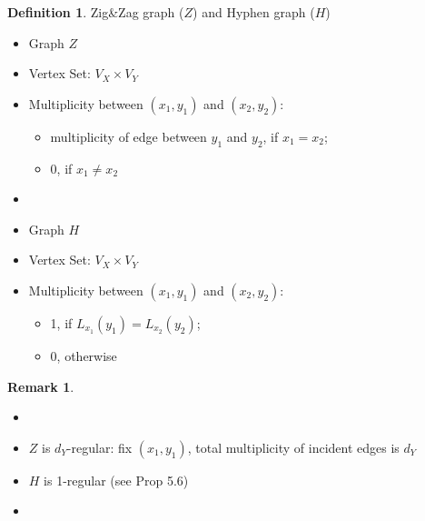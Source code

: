 \documentclass{book}
\theoremstyle{definition}
\newtheorem{definition}[lemma]{Definition}
\theoremstyle{remarkstyle}
\newtheorem*{remark}{Remark}%
\begin{document}
\begin{definition} Zig\&Zag graph ($Z$) and Hyphen graph ($H$) 
    \begin{itemize}
        \item Graph $Z$
        \item Vertex Set: $V_X\times V_Y$
        \item Multiplicity between $(x_1,y_1)$ and $(x_2,y_2)$:
        \begin{itemize}
            \item multiplicity of edge between $y_1$ and $y_2$, if $x_1=x_2$;
            \item 0, if $x_1 \neq x_2 $
        \end{itemize}
        \item[] 
        \item Graph $H$
        \item Vertex Set: $V_X\times V_Y$
        \item Multiplicity between $(x_1,y_1)$ and $(x_2,y_2)$:
        \begin{itemize}
            \item 1, if $L_{x_1}(y_1)=L_{x_2}(y_2)$;
            \item 0, otherwise 
        \end{itemize}
    \end{itemize}
\end{definition}
\begin{remark}
    \begin{itemize}
        \item[] 
        \item $Z$ is $d_Y$-regular: fix $(x_1,y_1) $, total multiplicity of incident edges is $d_Y$
        \item $H$ is 1-regular (see Prop 5.6)
        \item[] 
    \end{itemize}
\end{remark}
\end{document}
